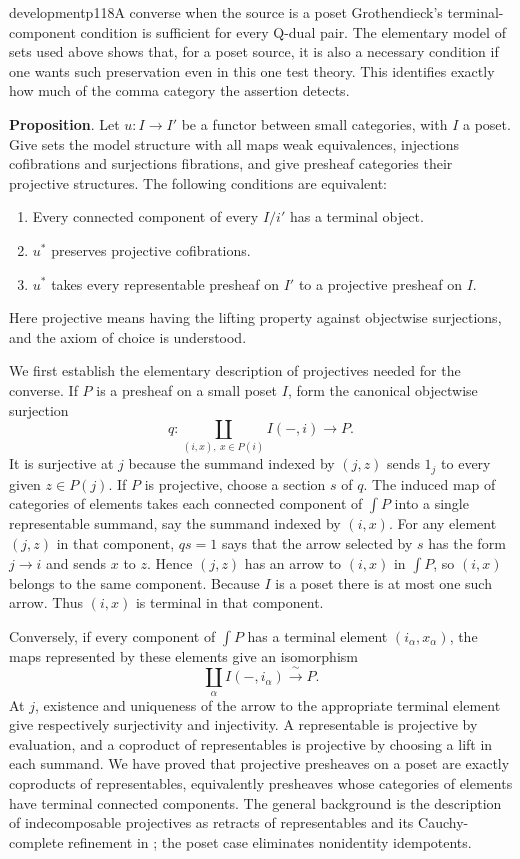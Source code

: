 \begin{dcomment}{development}{p118}{A converse when the source is a poset}
Grothendieck's terminal-component condition is sufficient for every Q-dual pair. The elementary model of sets used above shows that, for a poset source, it is also a necessary condition if one wants such preservation even in this one test theory. This identifies exactly how much of the comma category the assertion detects.

\textbf{Proposition}\ours.
Let $u:I\to I'$ be a functor between small categories, with $I$ a poset. Give sets the model structure with all maps weak equivalences, injections cofibrations and surjections fibrations, and give presheaf categories their projective structures. The following conditions are equivalent:
\begin{enumerate}
\item Every connected component of every $I/i'$ has a terminal object.
\item $u^*$ preserves projective cofibrations.
\item $u^*$ takes every representable presheaf on $I'$ to a projective presheaf on $I$.
\end{enumerate}
Here projective means having the lifting property against objectwise surjections, and the axiom of choice is understood.

We first establish the elementary description of projectives needed for the converse. If $P$ is a presheaf on a small poset $I$, form the canonical objectwise surjection
\[
 q:\coprod_{(i,x),\ x\in P(i)} I(-,i)\longrightarrow P.
\]
It is surjective at $j$ because the summand indexed by $(j,z)$ sends $1_j$ to every given $z\in P(j)$. If $P$ is projective, choose a section $s$ of $q$. The induced map of categories of elements takes each connected component of $\int P$ into a single representable summand, say the summand indexed by $(i,x)$. For any element $(j,z)$ in that component, $qs=1$ says that the arrow selected by $s$ has the form $j\to i$ and sends $x$ to $z$. Hence $(j,z)$ has an arrow to $(i,x)$ in $\int P$, so $(i,x)$ belongs to the same component. Because $I$ is a poset there is at most one such arrow. Thus $(i,x)$ is terminal in that component.

Conversely, if every component of $\int P$ has a terminal element $(i_\alpha,x_\alpha)$, the maps represented by these elements give an isomorphism
\[
 \coprod_\alpha I(-,i_\alpha)\xrightarrow{\ \sim\ }P.
\]
At $j$, existence and uniqueness of the arrow to the appropriate terminal element give respectively surjectivity and injectivity. A representable is projective by evaluation, and a coproduct of representables is projective by choosing a lift in each summand. We have proved that projective presheaves on a poset are exactly coproducts of representables, equivalently presheaves whose categories of elements have terminal connected components. The general background is the description of indecomposable projectives as retracts of representables and its Cauchy-complete refinement in \citet[Proposition~0.7 and Theorem~0.8]{vanOosten2021Topos}; the poset case eliminates nonidentity idempotents.


\end{dcomment}
